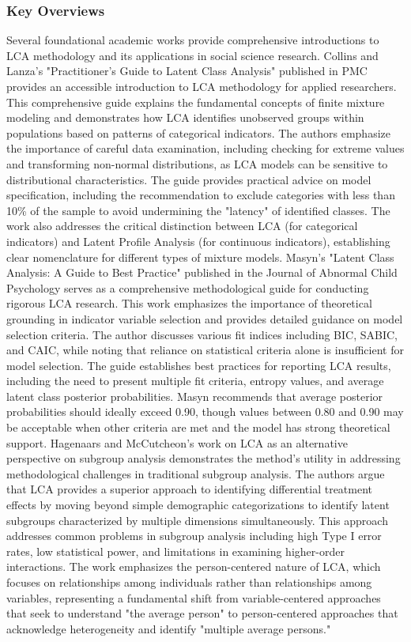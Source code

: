 \documentclass[main.tex]{subfiles}
\begin{document}
\subsubsection{Key Overviews}
Several foundational academic works provide comprehensive introductions to LCA methodology and its applications in social science research.
Collins and Lanza's "Practitioner's Guide to Latent Class Analysis" published in PMC provides an accessible introduction to LCA methodology for applied researchers\parencite{collins2021}. This comprehensive guide explains the fundamental concepts of finite mixture modeling and demonstrates how LCA identifies unobserved groups within populations based on patterns of categorical indicators. The authors emphasize the importance of careful data examination, including checking for extreme values and transforming non-normal distributions, as LCA models can be sensitive to distributional characteristics. The guide provides practical advice on model specification, including the recommendation to exclude categories with less than 10\% of the sample to avoid undermining the "latency" of identified classes. The work also addresses the critical distinction between LCA (for categorical indicators) and Latent Profile Analysis (for continuous indicators), establishing clear nomenclature for different types of mixture models.
Masyn's "Latent Class Analysis: A Guide to Best Practice" published in the Journal of Abnormal Child Psychology serves as a comprehensive methodological guide for conducting rigorous LCA research\parencite{masyn2020}. This work emphasizes the importance of theoretical grounding in indicator variable selection and provides detailed guidance on model selection criteria. The author discusses various fit indices including BIC, SABIC, and CAIC, while noting that reliance on statistical criteria alone is insufficient for model selection. The guide establishes best practices for reporting LCA results, including the need to present multiple fit criteria, entropy values, and average latent class posterior probabilities. Masyn recommends that average posterior probabilities should ideally exceed 0.90, though values between 0.80 and 0.90 may be acceptable when other criteria are met and the model has strong theoretical support.
Hagenaars and McCutcheon's work on LCA as an alternative perspective on subgroup analysis demonstrates the method's utility in addressing methodological challenges in traditional subgroup analysis\parencite{masyn2011}. The authors argue that LCA provides a superior approach to identifying differential treatment effects by moving beyond simple demographic categorizations to identify latent subgroups characterized by multiple dimensions simultaneously. This approach addresses common problems in subgroup analysis including high Type I error rates, low statistical power, and limitations in examining higher-order interactions. The work emphasizes the person-centered nature of LCA, which focuses on relationships among individuals rather than relationships among variables, representing a fundamental shift from variable-centered approaches that seek to understand "the average person" to person-centered approaches that acknowledge heterogeneity and identify "multiple average persons."
\end{document}
